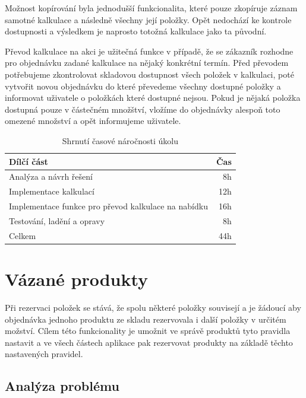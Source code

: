 Možnost kopírování byla jednodušší funkcionalita, které pouze zkopíruje záznam samotné kalkulace a následně všechny její položky. Opět nedochází ke kontrole dostupnosti a výsledkem je naprosto totožná kalkulace jako ta původní.

Převod kalkulace na akci je užitečná funkce v případě, že se zákazník rozhodne pro objednávku zadané kalkulace na nějaký konkrétní termín. Před převodem potřebujeme zkontrolovat skladovou dostupnost všech položek v kalkulaci, poté vytvořit novou objednávku do které převedeme všechny dostupné položky a informovat uživatele  o položkách které dostupné nejsou. Pokud je nějaká položka dostupná pouze v částečném množštví, vložíme do objednávky alespoň toto omezené množství a opět informujeme uživatele.


\begin{table}
	\centering
	\caption[Časová náročnost úkolu na kalkulace]{Shrnutí časové náročnosti úkolu}
	\label{tab:TopLevelTableLabel}
	{
		\begin{tabular}{lr}
			\toprule
			Dílčí část & Čas\\
			\midrule
			Analýza a návrh řešení & 8h \\
			Implementace kalkulací & 12h \\
            Implementace funkce pro převod kalkulace na nabídku & 16h \\
            Testování, ladění a opravy & 8h \\
            \midrule
            Celkem  & 44h \\
			\midrule
		\end{tabular}
	}
\end{table}

\section{Vázané produkty}

Při rezervaci položek se stává, že spolu některé položky souvisejí a je žádoucí aby objednávka jednoho produktu ze skladu rezervovala i další položky v určitém možství. Cílem této funkcionality je umožnit ve správě produktů tyto pravidla nastavit a ve všech částech aplikace pak rezervovat produkty na základě těchto nastavených pravidel.

\subsection{Analýza problému}

